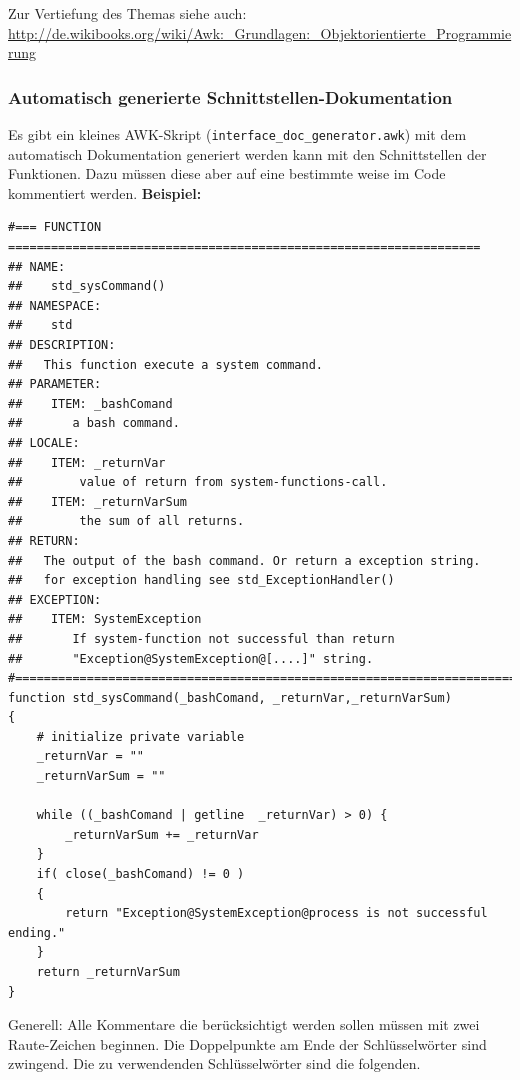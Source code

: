 \documentclass[10pt,a4paper]{article}
\begin{document}
\bigskip 
Zur Vertiefung des Themas siehe auch: \url{http://de.wikibooks.org/wiki/Awk:_Grundlagen:_Objektorientierte_Programmierung}

\subsubsection{Automatisch generierte Schnittstellen-Dokumentation}

Es gibt ein kleines AWK-Skript (\texttt{interface\_doc\_generator.awk}) mit dem automatisch Dokumentation generiert werden kann mit den Schnittstellen der Funktionen. Dazu müssen diese aber auf eine bestimmte weise im Code kommentiert werden. 
\bigskip 
\textbf{Beispiel:}


\begin{lstlisting}
#=== FUNCTION ==================================================================
## NAME:
##    std_sysCommand()
## NAMESPACE:
##    std
## DESCRIPTION:
##   This function execute a system command.
## PARAMETER:
##    ITEM: _bashComand
##       a bash command.
## LOCALE:
##    ITEM: _returnVar
##        value of return from system-functions-call.
##    ITEM: _returnVarSum
##        the sum of all returns.
## RETURN:
##   The output of the bash command. Or return a exception string.
##   for exception handling see std_ExceptionHandler()
## EXCEPTION:
##    ITEM: SystemException
##       If system-function not successful than return
##       "Exception@SystemException@[....]" string.
#==============================================================================
function std_sysCommand(_bashComand, _returnVar,_returnVarSum)
{
    # initialize private variable
    _returnVar = ""
    _returnVarSum = ""

    while ((_bashComand | getline  _returnVar) > 0) {
        _returnVarSum += _returnVar
    }
    if( close(_bashComand) != 0 )
    {
        return "Exception@SystemException@process is not successful ending."
    }
    return _returnVarSum
}
\end{lstlisting}

\bigskip 

Generell: Alle Kommentare die berücksichtigt werden sollen müssen mit zwei Raute-Zeichen beginnen. Die Doppelpunkte am Ende der Schlüsselwörter sind zwingend. Die zu verwendenden Schlüsselwörter sind die folgenden. 

\bigskip 
\end{document}
